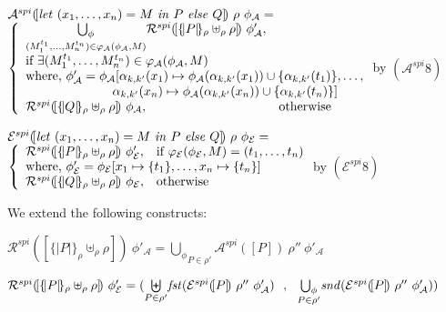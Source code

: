 \documentclass[10pt,a4paper,final,oneside,fleqn]{book}
\begin{document}
\noindent
$\mathcal{A}^{spi}(\![\mbox{{\itshape let\/} }(x_1,\ldots,x_n)=M\mbox{ {\itshape in\/} }P\mbox{ {\itshape else\/} }Q]\!)~\rho~\phi_\mathcal{A}=$\\
$\left\{\begin{array}{ll}
\underset{(M_1^{t_1},\ldots,M_n^{t_n})\in\varphi_\mathcal{A}(\phi_\mathcal{A},M)}{\bigcup_\phi}\mathcal{R}^{spi}(\![\{\!|P|\!\}_\rho\uplus_\rho\rho]\!)~\phi'_\mathcal{A},&\\
\multicolumn{2}{l}{\mbox{if }\exists(M_1^{t_1},\ldots,M_n^{t_n})\in\varphi_\mathcal{A}(\phi_\mathcal{A},M)}\\
\multicolumn{2}{l}{\mbox{where, }\phi'_\mathcal{A}=\phi_\mathcal{A}[\alpha_{k,k'}(x_1)\mapsto\phi_\mathcal{A}(\alpha_{k,k'}(x_1))\cup\{\alpha_{k,k'}(t_1)\},\ldots,}\\
\multicolumn{2}{l}{\hspace{24mm}\alpha_{k,k'}(x_n)\mapsto\phi_\mathcal{A}(\alpha_{k,k'}(x_n))\cup\{\alpha_{k,k'}(t_n)\}]}\\
\mathcal{R}^{spi}(\![\{\!|Q|\!\}_\rho\uplus_\rho\rho]\!)~\phi_\mathcal{A},&\mbox{otherwise}\\
\end{array}\right.$\hfill by $(\mathcal{A}^{spi} 8)$\vspace{5mm}

\noindent
$\mathcal{E}^{spi}(\![\mbox{{\itshape let\/} }(x_1,\ldots,x_n)=M\mbox{ {\itshape in\/} }P\mbox{ {\itshape else\/} }Q]\!)~\rho~\phi_\mathcal{E}=$\\
$\left\{\begin{array}{ll}
\mathcal{R}^{spi}(\![\{\!|P|\!\}_\rho\uplus_\rho\rho]\!)~\phi'_\mathcal{E},&\mbox{if }\varphi_\mathcal{E}(\phi_\mathcal{E},M)=(t_1,\ldots,t_n)\\
\multicolumn{2}{l}{\mbox{where, }\phi'_\mathcal{E}=\phi_\mathcal{E}[x_1\mapsto\{t_1\},\ldots,x_n\mapsto\{t_n\}]}\\
\mathcal{R}^{spi}(\![\{\!|Q|\!\}_\rho\uplus_\rho\rho]\!)~\phi_\mathcal{E},&\mbox{otherwise}\\
\end{array}\right.$\hfill by $(\mathcal{E}^{spi} 8)$\vspace{5mm}

\noindent
We extend the following constructs:

\noindent
$\mathcal{R}^{spi}(\![\{\!|P|\!\}_\rho\uplus_\rho\rho]\!)~\phi'_\mathcal{A}=\underset{P\in\rho'}{\bigcup_\phi}\mathcal{A}^{spi}(\![P]\!)~\rho''~\phi'_\mathcal{A}$

\noindent
$\mathcal{R}^{spi}(\![\{\!|P|\!\}_\rho\uplus_\rho\rho]\!)~\phi'_\mathcal{E}=(\underset{P\in\rho'}{\biguplus}\mbox{{\itshape fst\/}}(\mathcal{E}^{spi}(\![P]\!)~\rho''~\phi'_\mathcal{A})~~,~~\underset{P\in\rho'}{\bigcup_\phi}\mbox{{\itshape snd\/}}(\mathcal{E}^{spi}(\![P]\!)~\rho''~\phi'_\mathcal{A}))$
\end{document}
